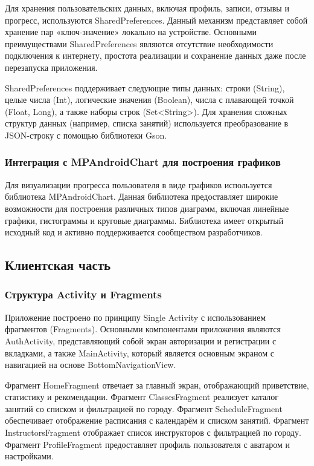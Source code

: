 Для хранения пользовательских данных, включая профиль, записи, отзывы и прогресс, используются SharedPreferences. Данный механизм представляет собой хранение пар «ключ-значение» локально на устройстве. Основными преимуществами SharedPreferences являются отсутствие необходимости подключения к интернету, простота реализации и сохранение данных даже после перезапуска приложения.

SharedPreferences поддерживает следующие типы данных: строки (String), целые числа (Int), логические значения (Boolean), числа с плавающей точкой (Float, Long), а также наборы строк (Set<String>). Для хранения сложных структур данных (например, списка занятий) используется преобразование в JSON-строку с помощью библиотеки Gson.

\subsubsection{Интеграция с MPAndroidChart для построения графиков}

Для визуализации прогресса пользователя в виде графиков используется библиотека MPAndroidChart. Данная библиотека предоставляет широкие возможности для построения различных типов диаграмм, включая линейные графики, гистограммы и круговые диаграммы. Библиотека имеет открытый исходный код и активно поддерживается сообществом разработчиков.

\subsection{Клиентская часть}

\subsubsection{Структура Activity и Fragments}

Приложение построено по принципу Single Activity с использованием фрагментов (Fragments). Основными компонентами приложения являются AuthActivity, представляющий собой экран авторизации и регистрации с вкладками, а также MainActivity, который является основным экраном с навигацией на основе BottomNavigationView.

Фрагмент HomeFragment отвечает за главный экран, отображающий приветствие, статистику и рекомендации. Фрагмент ClassesFragment реализует каталог занятий со списком и фильтрацией по городу. Фрагмент ScheduleFragment обеспечивает отображение расписания с календарём и списком занятий. Фрагмент InstructorsFragment отображает список инструкторов с фильтрацией по городу. Фрагмент ProfileFragment предоставляет профиль пользователя с аватаром и настройками.

